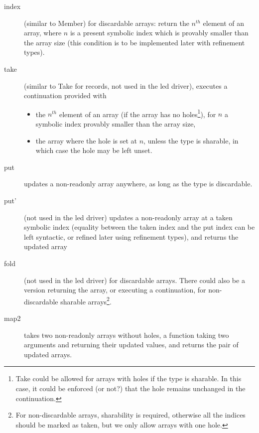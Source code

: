 \documentclass{article}
\begin{document}
\begin{description}
\item[index] (similar to Member) for discardable arrays: return the $n^{th}$
  element of an array, where $n$ is a present symbolic index
 which is provably smaller than the array size (this condition is to be
 implemented later with refinement types).
 \item[take] (similar to Take for records, not used in the led driver), executes
   a continuation provided with
   \begin{itemize}
   \item 
     the $n^{th}$ element of an array (if the
     array has no holes\footnote{Take could be allowed for
       arrays with holes if the type is sharable. In this case, it could be enforced (or
       not?) that the hole remains unchanged in the continuation.}), for $n$ a symbolic index provably smaller than the array
     size,
     \item the array where the hole is set at $n$, unless the type is sharable,
       in which case the hole may be left unset.
   \end{itemize}
 \item[put] updates a non-readonly array anywhere, as long as the type is discardable.
  \item[put'] (not used in the led driver) updates a non-readonly array at a taken symbolic index (equality between the
    taken index and the put index can be left syntactic, or refined later using
    refinement types), and returns the updated array
    \item[fold] (not used in the led driver) for discardable arrays. There could also be a version returning the
      array, or executing a continuation, for non-discardable sharable
      arrays\footnote{For non-discardable arrays, sharability is required, otherwise
        all the indices should be marked as taken, but we only allow arrays with
      one hole.}.
    \item[map2] takes two non-readonly arrays without holes, a function taking
      two arguments and returning their updated values, and returns the pair of
      updated arrays.
\end{description}
\end{document}
